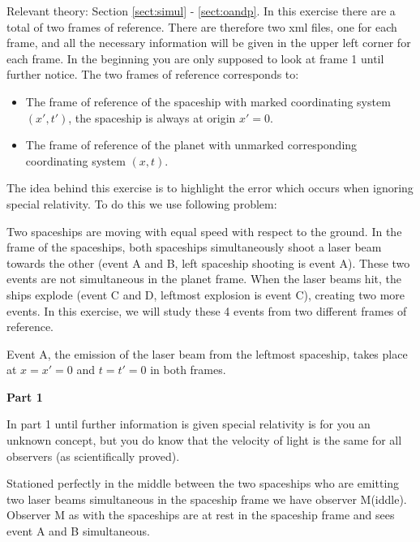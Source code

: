 {\begin{multicols}{2}
\vspace{0.5cm}


Relevant theory: Section \ref{sect:simul} - \ref{sect:oandp}.\newline
In this exercise there are a total of two frames of reference. There are therefore two xml files, one for each frame, and all the necessary information will be given in the upper left corner for each frame. In the beginning you are only supposed to look at frame 1 until further notice. The two frames of reference corresponds to:
\begin{itemize}
\item The frame of reference of the spaceship with marked coordinating system $(x',t')$, the spaceship is always at origin $x'=0$.
\item The frame of reference of the planet with unmarked corresponding coordinating system $(x,t)$.
\end{itemize}

The idea behind this exercise is to highlight the error which occurs when ignoring special relativity. To do this we use following problem:

Two spaceships are moving with equal speed with respect to the ground. In the frame of the spaceships, both spaceships simultaneously shoot a laser beam towards the other (event A and B, left spaceship shooting is event A). These two events are not simultaneous in the planet frame. When the laser beams hit, the ships explode (event C and D, leftmost explosion is event C), creating two more events. In this exercise, we will study these 4 events from two different frames of reference.

Event A, the emission of the laser beam from the leftmost spaceship, takes place at $x=x'=0$ and $t=t'=0$ in both frames.

\textbf{Part 1}

In part 1 until further information is given special relativity is for you an unknown concept, but you do know that the velocity of light is the same for all observers (as scientifically proved).

Stationed perfectly in the middle between the two spaceships who are emitting two laser beams simultaneous in the spaceship frame we have observer M(iddle). Observer M as with the spaceships are at rest in the spaceship frame and sees event A and B simultaneous.

\begin{enumerate}


\end{enumerate}
\end{multicols}}
